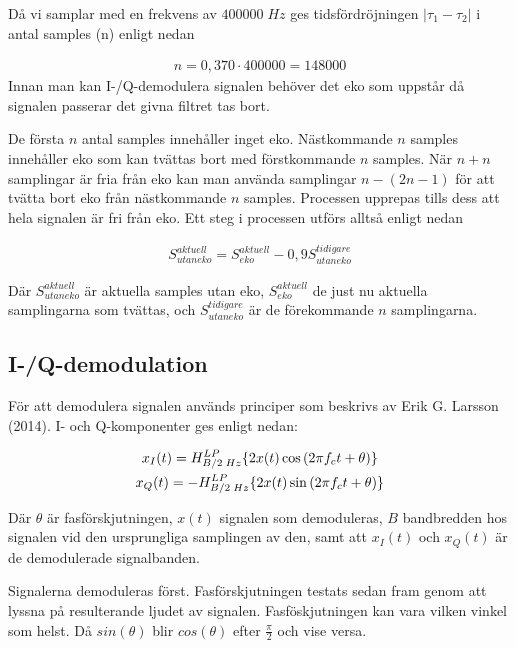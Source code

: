 \documentclass[10pt,twocolumn]{article}
\begin{document}
Då vi samplar med en frekvens av $400 000\;Hz$ ges tidsfördröjningen $|\tau_1 - \tau_2|$ i antal samples (n) enligt nedan 

\begin{gather}
n = 0,370 \cdot 400 000 = 148 000
\label{equ:delaySamples}
\end{gather}
Innan man kan I-/Q-demodulera signalen behöver det eko som uppstår då signalen passerar det givna filtret tas bort. 

De första $n$ antal samples innehåller inget eko. Nästkommande $n$ samples innehåller eko som kan tvättas bort med förstkommande $n$ samples. När $n+n$ samplingar är fria från eko kan man använda samplingar $n-(2n-1)$ för att tvätta bort eko från nästkommande $n$ samples. Processen upprepas tills dess att hela signalen är fri från eko. Ett steg i processen utförs alltså enligt nedan

\begin{gather}
S_{utan eko}^{aktuell} = S_{eko}^{aktuell} - 0,9S_{utan eko}^{tidigare}
\label{equ:eko}
\end{gather}

Där $S_{utan eko}^{aktuell}$ är aktuella samples utan eko, $S_{eko}^{aktuell}$ de just nu aktuella samplingarna som tvättas, och $S_{utan eko}^{tidigare}$ är de förekommande $n$ samplingarna. 

\subsection{I-/Q-demodulation}

För att demodulera signalen används principer som beskrivs av Erik G. Larsson (2014). I- och Q-komponenter ges enligt nedan: 

\begin{gather}
x_{I}(t) = \Large{H}_{B/2\;Hz}^{LP}\{2x(t)\cos{(2{\pi}f_{c}t + \theta)}\} \\
x_{Q}(t) = -\Large{H}_{B/2\;Hz}^{LP}\{2x(t)\sin{(2{\pi}f_{c}t + \theta)}\}
\label{equ:iq}
\end{gather}

Där $\theta$ är fasförskjutningen, $x(t)$ signalen som demoduleras, $B$ bandbredden hos signalen vid den ursprungliga samplingen av den, samt att $x_{I}(t)$ och $x_{Q}(t)$ är de demodulerade signalbanden. 

Signalerna demoduleras först. Fasförskjutningen testats sedan fram genom att lyssna på resulterande ljudet av signalen. Fasföskjutningen kan vara vilken vinkel som helst. Då $sin(\theta)$ blir $cos(\theta)$ efter $\frac{\pi}{2}$ och vise versa. 
\end{document}
